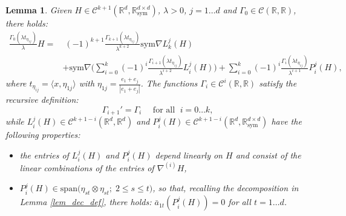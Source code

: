 \documentclass[reqno,twoside,11pt]{amsart}
\newcommand{\sym}{\mathrm{sym}}
\newcommand{\R}{\mathbb{R}}
\numberwithin{equation}{section}
\theoremstyle{plain}
\newtheorem{lemma}[theorem]{Lemma}
\theoremstyle{definition}
\begin{document}
\begin{lemma}\label{lem_IBP}
Given  $H\in\mathcal{C}^{k+1}(\R^d,\R^{d\times d}_\sym)$, $\lambda>0$,
$j=1\ldots d$ and $\Gamma_0\in\mathcal{C}(\R,\R)$, there holds:
\begin{equation}\label{ibp}
\begin{split}
\frac{\Gamma_0(\lambda t_{\eta_{1j}})}{\lambda}H = & \; (-1)^{k+1}\frac{\Gamma_{k+1}(\lambda
  t_{\eta_{1j}})}{\lambda^{k+2}} \sym\nabla L^{j}_k(H)  \\ & + \sym\nabla
\Big(\sum_{i=0}^k(-1)^i\frac{\Gamma_{i+1}(\lambda t_{\eta_{1j}})}{\lambda^{i+2}}L_i^j(H)\Big) 
+ \sum_{i=0}^{k}(-1)^i\frac{\Gamma_i(\lambda t_{\eta_{1j}})}{\lambda^{i+1}} P_i^j(H),
\end{split}
\end{equation}
where $t_{\eta_{ij}}=\langle x, \eta_{1j}\rangle$ with
$\eta_{1j} = \frac{e_1+e_j}{|e_1+e_j|}$. The functions $\Gamma_i\in
\mathcal{C}^{i}(\R,\R)$ satisfy the recursive definition: 
\begin{equation}\label{recu_ibp}
\Gamma_{i+1}' = \Gamma_{i}  \quad\mbox{ for all } \; i =0\ldots k,
\end{equation}
while $L_i^j(H)\in\mathcal{C}^{k+1-i}(\R^d,\R^d)$ and
$P_i^j(H)\in\mathcal{C}^{k+1-i}(\R^d,\R^{d\times d}_\sym)$ have the following properties:
\begin{itemize}
\item[(i)] the entries of $L_i^j(H)$ and $P_i^j(H)$ depend linearly on
  $H$ and consist of the linear combinations of the entries
  of $\nabla^{(i)}H$, 
\item[(ii)] $P_i^j(H)\in\mathrm{span}\big(\eta_{st}\otimes
  \eta_{st};\; 2\leq s\leq t\big)$, so that, recalling the
  decomposition in Lemma \ref{lem_dec_def}, there holds: $\bar
  a_{1t}(P_i^j(H))=0$ for all $t=1\ldots d$.
\end{itemize}
\end{lemma}
\end{document}
